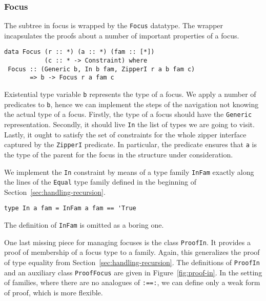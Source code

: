 \documentclass[runningheads]{llncs}
\newcommand{\K}[1]{\lstinline{#1}}
\begin{document}
\subsubsection{Focus}

The subtree in focus is wrapped by the \K{Focus} datatype. 
The wrapper incapsulates the proofs about a number of important properties of a focus.
\begin{lstlisting}
data Focus (r :: *) (a :: *) (fam :: [*])
           (c :: * -> Constraint) where
 Focus :: (Generic b, In b fam, ZipperI r a b fam c)
       => b -> Focus r a fam c
\end{lstlisting}
Existential type variable \K{b} represents the type of a focus. We apply a number of predicates to \K{b}, hence we can implement the steps of the navigation not knowing the actual type of a focus. Firstly, the type of a focus should have the \K{Generic} representation. Secondly, it should live \K{In} the list of types we are going to visit. Lastly, it ought to satisfy the set of constraints for the whole zipper interface captured by the \K{ZipperI} predicate. In particular, the predicate ensures that \K{a} is the type of the parent for the focus in the structure under consideration.

We implement the \K{In} constraint by means of a type family \K{InFam} exactly along the lines of the \K{Equal} type family defined in the beginning of Section~\ref{sec:handling-recursion}. 
\begin{lstlisting}
type In a fam = InFam a fam == 'True
\end{lstlisting}
The definition of \K{InFam} is omitted as a boring one.

One last missing piece for managing focuses is the class \K{ProofIn}. It provides a proof of membership of a focus type to a family. Again, this generalizes the proof of type equality from Section~\ref{sec:handling-recursion}. The definitions of \K{ProofIn} and an auxiliary class \K{ProofFocus} are given in Figure~\ref{fig:proof-in}. In the setting of families, where there are no analogues of \K{:==:}, we can define only a weak form of proof, which is more flexible.
\end{document}
